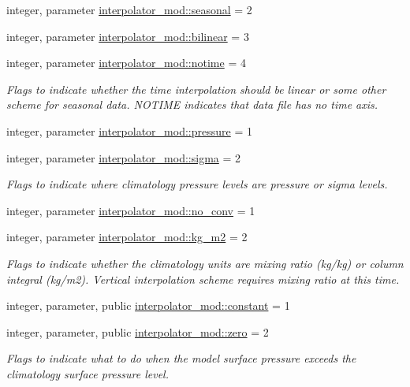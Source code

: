 \begin{DoxyCompactItemize}
\item 
integer, parameter \hyperlink{namespaceinterpolator__mod_ab2befb1b590b857a49f22536716db35d}{interpolator\+\_\+mod\+::seasonal} = 2
\item 
integer, parameter \hyperlink{namespaceinterpolator__mod_a64b64cb9cf29aa6f001fc15e47b3380c}{interpolator\+\_\+mod\+::bilinear} = 3
\item 
integer, parameter \hyperlink{namespaceinterpolator__mod_a88b6fdd8d37ba85e09ff1f5a9b2d07ab}{interpolator\+\_\+mod\+::notime} = 4
\begin{DoxyCompactList}\small\item\em Flags to indicate whether the time interpolation should be linear or some other scheme for seasonal data. N\+O\+T\+I\+ME indicates that data file has no time axis. \end{DoxyCompactList}\item 
integer, parameter \hyperlink{namespaceinterpolator__mod_a0fd9465334bb2c39bcc5090ab821d0b3}{interpolator\+\_\+mod\+::pressure} = 1
\item 
integer, parameter \hyperlink{namespaceinterpolator__mod_a621aafe73fb97a0187230316cd5c4ac5}{interpolator\+\_\+mod\+::sigma} = 2
\begin{DoxyCompactList}\small\item\em Flags to indicate where climatology pressure levels are pressure or sigma levels. \end{DoxyCompactList}\item 
integer, parameter \hyperlink{namespaceinterpolator__mod_a40a1ac7ecc3a790262fa82f59179a0e1}{interpolator\+\_\+mod\+::no\+\_\+conv} = 1
\item 
integer, parameter \hyperlink{namespaceinterpolator__mod_a6a62074fd8f0b8b897a7c96fa9d93c30}{interpolator\+\_\+mod\+::kg\+\_\+m2} = 2
\begin{DoxyCompactList}\small\item\em Flags to indicate whether the climatology units are mixing ratio (kg/kg) or column integral (kg/m2). Vertical interpolation scheme requires mixing ratio at this time. \end{DoxyCompactList}\item 
integer, parameter, public \hyperlink{namespaceinterpolator__mod_af3aa87fa602fb4a19b39e27cd19fa99a}{interpolator\+\_\+mod\+::constant} = 1
\item 
integer, parameter, public \hyperlink{namespaceinterpolator__mod_a4a4f1f5ef4024f3705d0560213d4e6fb}{interpolator\+\_\+mod\+::zero} = 2
\begin{DoxyCompactList}\small\item\em Flags to indicate what to do when the model surface pressure exceeds the climatology surface pressure level. \end{DoxyCompactList}\item 

\end{DoxyCompactItemize}
